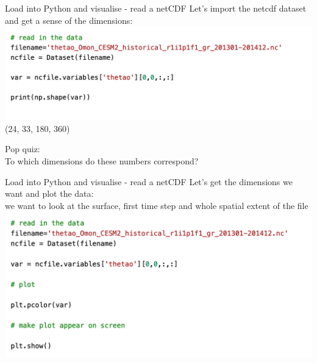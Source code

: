 
\begin{frame}{\insertsectionnumber{ |} Load into Python and visualise - read a netCDF} 
    Let's import the netcdf dataset and get a sense of the dimensions:\\
        \vspace{0.5cm}
    \includegraphics[scale=0.35]{images/Script1_step2.png}
        \vspace{2cm}
    (24, 33, 180, 360)
    \begin{beamerboxesrounded}[lower=gray,shadow=true]{Pop quiz:\\
       To which dimensions do these numbers correspond?}
    \end{beamerboxesrounded}
\end{frame}
 
 
\begin{frame}{\insertsectionnumber{ |} Load into Python and visualise - read a netCDF}
    Let's get the dimensions we want and plot the data:\\
        \vspace{0.5cm}
    we want to look at the surface, first time step and whole spatial extent of the file
        \vspace{0.5cm}
    \includegraphics[scale=0.35]{images/Script1_step3.png}
\end{frame}
 
